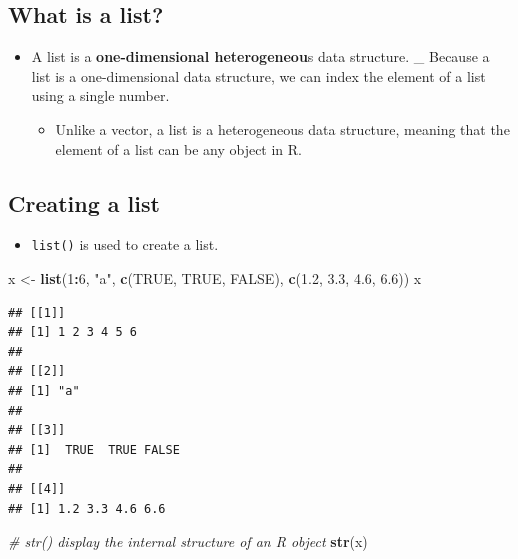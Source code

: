 \documentclass[]{book}
\newenvironment{Shaded}{\begin{snugshade}}{\end{snugshade}}
\newcommand{\CommentTok}[1]{\textcolor[rgb]{0.56,0.35,0.01}{\textit{#1}}}
\newcommand{\DecValTok}[1]{\textcolor[rgb]{0.00,0.00,0.81}{#1}}
\newcommand{\FloatTok}[1]{\textcolor[rgb]{0.00,0.00,0.81}{#1}}
\newcommand{\KeywordTok}[1]{\textcolor[rgb]{0.13,0.29,0.53}{\textbf{#1}}}
\newcommand{\NormalTok}[1]{#1}
\newcommand{\OperatorTok}[1]{\textcolor[rgb]{0.81,0.36,0.00}{\textbf{#1}}}
\newcommand{\OtherTok}[1]{\textcolor[rgb]{0.56,0.35,0.01}{#1}}
\newcommand{\StringTok}[1]{\textcolor[rgb]{0.31,0.60,0.02}{#1}}
\providecommand{\tightlist}{%
  \setlength{\itemsep}{0pt}\setlength{\parskip}{0pt}}
\begin{document}
\hypertarget{what-is-a-list}{%
\subsection{What is a list?}\label{what-is-a-list}}

\begin{itemize}
\tightlist
\item
  A list is a \textbf{one-dimensional heterogeneou}s data structure.
  \_ Because a list is a one-dimensional data structure, we can index the element of a list using a single number.

  \begin{itemize}
  \tightlist
  \item
    Unlike a vector, a list is a heterogeneous data structure, meaning that the element of a list can be any object in R.
  \end{itemize}
\end{itemize}

\hypertarget{creating-a-list}{%
\subsection{Creating a list}\label{creating-a-list}}

\begin{itemize}
\tightlist
\item
  \texttt{list()} is used to create a list.
\end{itemize}

\begin{Shaded}
\begin{Highlighting}[]
\NormalTok{x <-}\StringTok{ }\KeywordTok{list}\NormalTok{(}\DecValTok{1}\OperatorTok{:}\DecValTok{6}\NormalTok{, }\StringTok{"a"}\NormalTok{, }\KeywordTok{c}\NormalTok{(}\OtherTok{TRUE}\NormalTok{, }\OtherTok{TRUE}\NormalTok{, }\OtherTok{FALSE}\NormalTok{), }\KeywordTok{c}\NormalTok{(}\FloatTok{1.2}\NormalTok{, }\FloatTok{3.3}\NormalTok{, }\FloatTok{4.6}\NormalTok{, }\FloatTok{6.6}\NormalTok{))}
\NormalTok{x}
\end{Highlighting}
\end{Shaded}

\begin{verbatim}
## [[1]]
## [1] 1 2 3 4 5 6
## 
## [[2]]
## [1] "a"
## 
## [[3]]
## [1]  TRUE  TRUE FALSE
## 
## [[4]]
## [1] 1.2 3.3 4.6 6.6
\end{verbatim}

\begin{Shaded}
\begin{Highlighting}[]
\CommentTok{# str() display the internal structure of an R object}
\KeywordTok{str}\NormalTok{(x)}
\end{Highlighting}
\end{Shaded}
\end{document}
